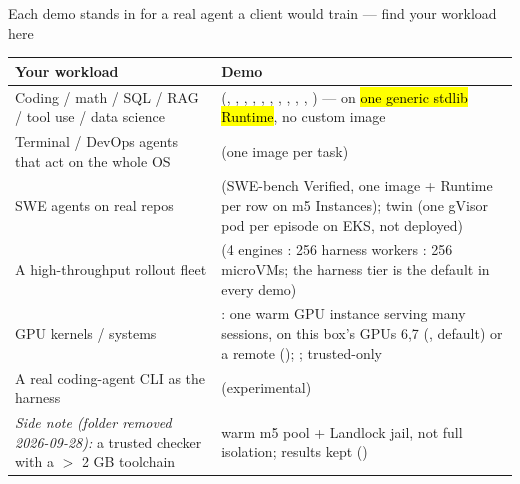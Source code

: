 \begin{frame}{Each demo stands in for a real agent a client would train --- find your workload here}
\scriptsize\setlength{\tabcolsep}{4pt}
\begin{tabularx}{\textwidth}{@{}>{\raggedright\arraybackslash}p{4.3cm} Y@{}}
\toprule
\textbf{Your workload} & \textbf{Demo}\\
\midrule
Coding / math / SQL / RAG / tool use / data science &  (, , , , , , , , , , ) --- on \hl{one generic stdlib Runtime}, no custom image\\
Terminal / DevOps agents that act on the whole OS &  (one image per task)\\
SWE agents on real repos &  (SWE-bench Verified, one image + Runtime per row on m5 Instances); twin  (one gVisor pod per episode on EKS, not deployed)\\
A high-throughput rollout fleet &  (4 engines : 256 harness workers : 256 microVMs; the harness tier is the default in every demo)\\
GPU kernels / systems & : one warm GPU instance serving many sessions, on this box's GPUs 6,7 (, default) or a remote  (); ; trusted-only\\
A real coding-agent CLI as the harness &  (experimental)\\
\midrule
\textit{Side note (folder removed 2026-09-28):} a trusted checker with a $>$ 2 GB toolchain & warm m5 pool + Landlock jail, not full isolation; results kept ()\\
\bottomrule
\end{tabularx}
\end{frame}

